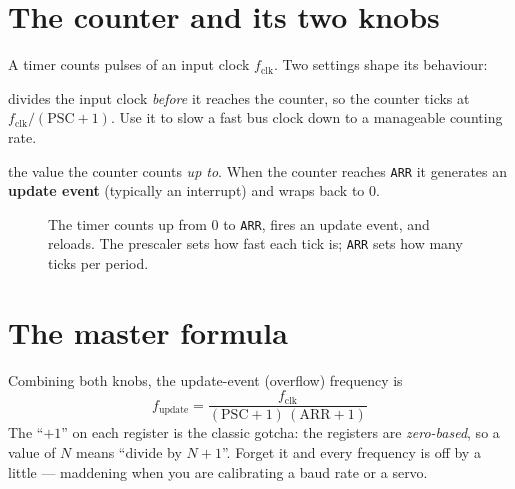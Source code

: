 \documentclass[11pt,a4paper,oneside]{book}
\newcommand{\code}[1]{\texttt{#1}}
\begin{document}
\section{The counter and its two knobs}
A timer counts pulses of an input clock $f_{\text{clk}}$. Two settings shape its
behaviour:
\begin{description}[leftmargin=1.6cm,style=nextline]
  \item[Prescaler (\code{PSC})] divides the input clock \emph{before} it reaches
        the counter, so the counter ticks at $f_{\text{clk}}/(\text{PSC}+1)$.
        Use it to slow a fast bus clock down to a manageable counting rate.
  \item[Auto-reload (\code{ARR}, the ``period'')] the value the counter counts
        \emph{up to}. When the counter reaches \code{ARR} it generates an
        \textbf{update event} (typically an interrupt) and wraps back to 0.
\end{description}

\begin{figure}[h]
\centering
{}
\caption{The timer counts up from 0 to \code{ARR}, fires an update event, and
reloads. The prescaler sets how fast each tick is; \code{ARR} sets how many
ticks per period.}
\label{fig:timer-saw}
\end{figure}

\section{The master formula}
Combining both knobs, the update-event (overflow) frequency is
\[
\boxed{\;f_{\text{update}}
   = \frac{f_{\text{clk}}}{(\text{PSC}+1)\,(\text{ARR}+1)}\;}
\]
The ``$+1$'' on each register is the classic gotcha: the registers are
\emph{zero-based}, so a value of $N$ means ``divide by $N+1$''. Forget it and
every frequency is off by a little --- maddening when you are calibrating a baud
rate or a servo.
\end{document}
